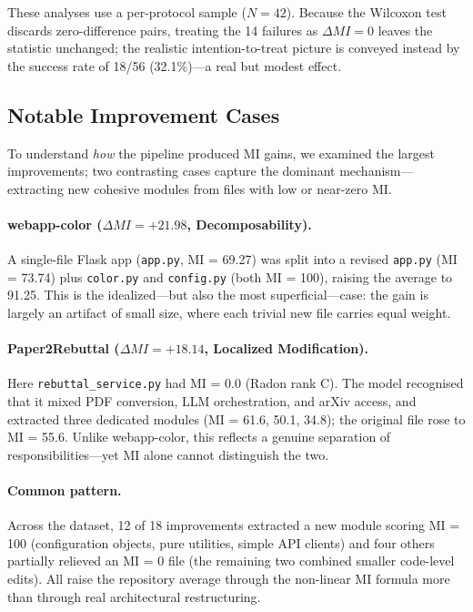 \documentclass[runningheads]{llncs}
\begin{document}
These analyses use a per-protocol sample ($N = 42$). Because the Wilcoxon test discards zero-difference pairs, treating the 14 failures as $\Delta MI = 0$ leaves the statistic unchanged; the realistic intention-to-treat picture is conveyed instead by the success rate of 18/56 (32.1\%)---a real but modest effect.

\subsection{Notable Improvement Cases}
\label{subsec:exp5_cases}

To understand \textit{how} the pipeline produced MI gains, we examined the largest improvements; two contrasting cases capture the dominant mechanism---extracting new cohesive modules from files with low or near-zero MI.

\paragraph{webapp-color ($\Delta MI = +21.98$, Decomposability).}
A single-file Flask app (\texttt{app.py}, MI = 69.27) was split into a revised \texttt{app.py} (MI = 73.74) plus \texttt{color.py} and \texttt{config.py} (both MI = 100), raising the average to 91.25. This is the idealized---but also the most superficial---case: the gain is largely an artifact of small size, where each trivial new file carries equal weight.

\paragraph{Paper2Rebuttal ($\Delta MI = +18.14$, Localized Modification).}
Here \texttt{rebuttal\_service.py} had MI = 0.0 (Radon rank C). The model recognised that it mixed PDF conversion, LLM orchestration, and arXiv access, and extracted three dedicated modules (MI = 61.6, 50.1, 34.8); the original file rose to MI = 55.6. Unlike webapp-color, this reflects a genuine separation of responsibilities---yet MI alone cannot distinguish the two.

\paragraph{Common pattern.}
Across the dataset, 12 of 18 improvements extracted a new module scoring MI = 100 (configuration objects, pure utilities, simple API clients) and four others partially relieved an MI = 0 file (the remaining two combined smaller code-level edits). All raise the repository average through the non-linear MI formula more than through real architectural restructuring.
\end{document}
